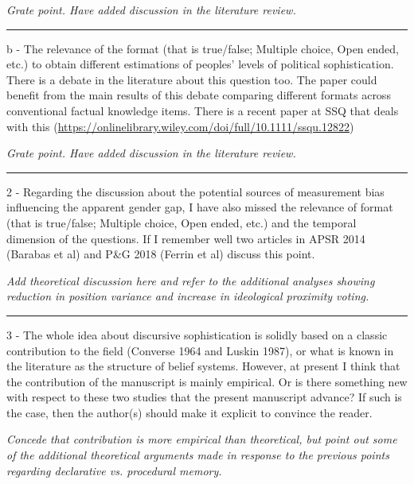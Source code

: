 \textit{Grate point. Have added discussion in the literature review.}


\rule{\linewidth}{.01cm}

b - The relevance of the format (that is true/false; Multiple choice, Open ended, etc.) to obtain different estimations of peoples' levels of political sophistication. There is a debate in the literature about this question too. The paper could benefit from the main results of this debate comparing different formats across conventional factual knowledge items. There is a recent paper at SSQ that deals with this (\url{https://onlinelibrary.wiley.com/doi/full/10.1111/ssqu.12822})

\textit{Grate point. Have added discussion in the literature review.}


\rule{\linewidth}{.01cm}

2 - Regarding the discussion about the potential sources of measurement bias influencing the apparent gender gap, I have also missed the relevance of format (that is true/false; Multiple choice, Open ended, etc.) and the temporal dimension of the questions. If I remember well two articles in APSR 2014 (Barabas et al) and P\&G 2018 (Ferrin et al) discuss this point.

\textit{Add theoretical discussion here and refer to the additional analyses showing reduction in position variance and increase in ideological proximity voting.}


\rule{\linewidth}{.01cm}

3 - The whole idea about discursive sophistication is solidly based on a classic contribution to the field (Converse 1964 and Luskin 1987), or what is known in the literature as the structure of belief systems. However, at present I think that the contribution of the manuscript is mainly empirical. Or is there something new with respect to these two studies that the present manuscript advance? If such is the case, then the author(s) should make it explicit to convince the reader.

\textit{Concede that contribution is more empirical than theoretical, but point out some of the additional theoretical arguments made in response to the previous points regarding declarative vs. procedural memory.}


